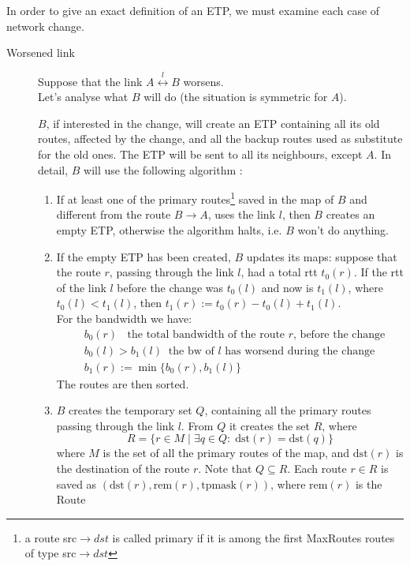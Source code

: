 \documentclass[a4paper]{article}
\newcommand{\T}[1]{\textrm{#1}}
\begin{document}
In order to give an exact definition of an ETP, we must examine each case of network change.
\begin{description}
	\item[Worsened link] 
		\label{wlink}
		Suppose that the link $A
		\stackrel{l}{\leftrightarrow} B$ worsens.\\
		Let's analyse what $B$ will do (the situation is symmetric for
		$A$).

		$B$, if interested in the change, will create an ETP
		containing all its old routes, affected by the change, and all
		the backup routes used as substitute for the old ones. The ETP
		will be sent to all its neighbours, except $A$. In detail,
		$B$ will use the following algorithm
		:
		\begin{enumerate}
		\item If at least one of the primary
		       routes\footnote{
				a route src$\rightarrow dst$ is called primary
				if it is among the first MaxRoutes routes of
				type src$\rightarrow dst$}
			saved in the map
			of $B$ and different from the route $B\rightarrow A$, uses the link $l$, then $B$ creates an
			empty ETP, otherwise the algorithm halts, i.e. $B$
			won't do anything.
		\item \label{upmap}
			If the empty ETP has been created, $B$ updates its maps:
			suppose that the route $r$, passing through the link
			$l$, had a total rtt $t_0(r)$. If the rtt of the link
			$l$ before the change was $t_0(l)$ and now is
			$t_1(l)$, where $t_0(l) < t_1(l)$, then
			$t_1(r):=t_0(r)-t_0(l)+t_1(l)$.\\
			For the bandwidth we have:
			\begin{align*}
				&b_0(r)\;\;\T{ the total bandwidth of the
				route $r$, before the change}\\
				&b_0(l) > b_1(l)\;\;\T{the bw of $l$ has
				worsend during the change}\\
				&b_1(r):=\min \{b_0(r), b_1(l)\}
			\end{align*}
			The routes are then sorted.
		\item \label{stepR} 
			$B$ creates the temporary set $Q$, 
			containing all the primary
			routes passing through the link $l$. From $Q$
			it creates the set $R$, where
			\[
			R=\{r\in M\;|\;\exists q\in Q:\;\T{dst}(r)=\T{dst}(q)\}
			\]
			where $M$ is the set of all the primary routes of the map, and 
			$\T{dst}(r)$ is the destination of the route $r$.
			Note that $Q\subseteq R$.
			Each
			route $r\in R$ is saved as $(\T{dst}(r), \T{rem}(r),
			\T{tpmask}(r))$, where $\T{rem}(r)$ is the Route

\end{enumerate}
\end{description}
\end{document}

